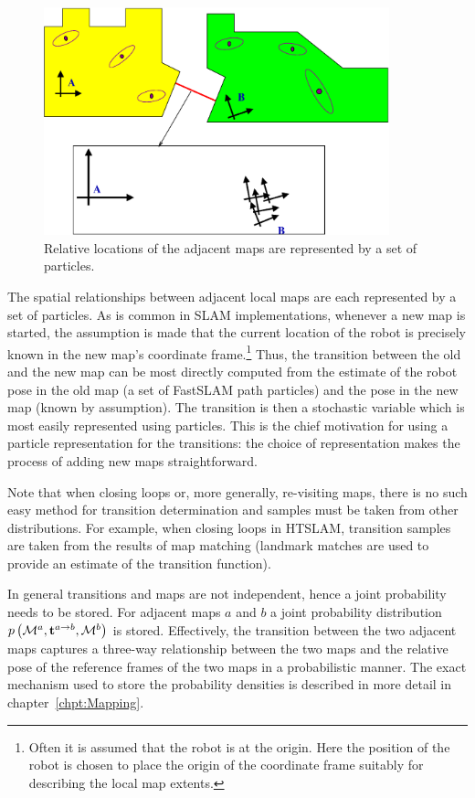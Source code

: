 \begin{figure}
\begin{center}
\includegraphics[width=10cm]{Pics/fig_transition_model}
\end{center}
\caption{Relative locations of the adjacent maps are represented by a
  set of particles.}
\end{figure}

The spatial relationships between adjacent local maps are each
represented by a set of particles.  As is common in SLAM
implementations, whenever a new map is started, the assumption is made
that the current location of the robot is precisely known in the new
map's coordinate frame.\footnote{Often it is assumed that the robot is
at the origin.  Here the position of the robot is chosen to place the
origin of the coordinate frame suitably for describing the local map
extents.} Thus, the transition between the old and the new map can be
most directly computed from the estimate of the robot pose in the old
map (a set of FastSLAM path particles) and the pose in the new map
(known by assumption). The transition is then a stochastic variable
which is most easily represented using particles. This is the chief
motivation for using a particle representation for the
transitions: the choice of representation makes the process of adding
new maps straightforward.

Note that when closing loops or, more generally, re-visiting maps,
there is no such easy method for transition determination and samples
must be taken from other distributions. For example, when closing
loops in HTSLAM, transition samples are taken from the results of map
matching (landmark matches are used to provide an estimate of
the transition function).

In general transitions and maps are not independent,
hence a joint probability needs to be stored. For adjacent maps $a$
and $b$ a joint probability distribution
$\prob{\map{}{}{a},\tr{}{a}{b}, \map{}{}{b}}$ is stored. Effectively,
the transition between the two adjacent maps captures a three-way
relationship between the two maps and the relative pose of the
reference frames of the two maps in a probabilistic manner. The exact
mechanism used to store the probability densities is described in more
detail in chapter~\ref{chpt:Mapping}.

